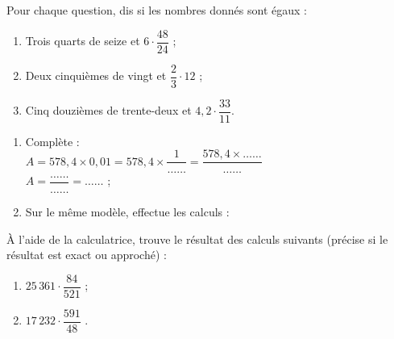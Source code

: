 \begin{exercice}
Pour chaque question, dis si les nombres donnés sont égaux :
\begin{enumerate}
 \item Trois quarts de seize et $6 \cdot \dfrac{48}{24}$ ;
 \item Deux cinquièmes de vingt et $\dfrac{2}{3} \cdot 12$ ;
 \item Cinq douzièmes de trente-deux et $4,2 \cdot \dfrac{33}{11}$.
 \end{enumerate}
\end{exercice}


\begin{exercice}
\begin{enumerate}
 \item Complète : \\[0.2em]
$A = 578,4 \times 0,01 = 578,4 \times \dfrac{1}{\ldots \ldots} = \dfrac{578,4 \times \ldots \ldots}{\ldots \ldots}$\\[1em]
$A = \dfrac{\ldots \ldots}{\ldots \ldots} = \ldots \ldots$ ;
\vspace{0.2cm}       
 \item Sur le même modèle, effectue les calculs :
 \end{enumerate}
\end{exercice}


\begin{exercice}
À l'aide de la calculatrice, trouve le résultat des calculs suivants (précise si le résultat est exact ou approché) :
\begin{enumerate}
 \item $25\,361 \cdot \dfrac{84}{521}$ \dotfill;
 \vspace{0.5cm}
 \item $17\,232 \cdot \dfrac{591}{48}$ \dotfill.
 \end{enumerate}
\end{exercice}


\newpage


